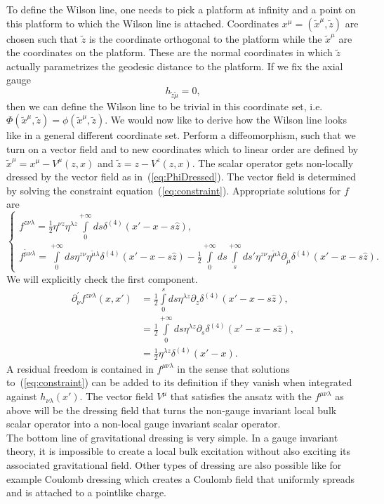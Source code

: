 \documentclass{PoS}
\begin{document}
To define the Wilson line, one needs to pick a platform at infinity and a point on this platform to which the Wilson line is attached. Coordinates $x^\mu = (\tilde{x}^\mu,\tilde{z})$ are chosen such that $\tilde{z}$ is the coordinate orthogonal to the platform while the $\tilde{x}^\mu$ are the coordinates on the platform. These are the normal coordinates in which $\tilde{z}$ actually parametrizes the geodesic distance to the platform. If we fix the axial gauge
\begin{equation}
h_{\tilde{z}\tilde{\mu}}=0,
\end{equation}
then we can define the Wilson line to be trivial in this coordinate set, i.e. $\Phi(\tilde{x}^\mu,\tilde{z}) = \phi(\tilde{x}^\mu,\tilde{z})$. We would now like to derive how the Wilson line looks like in a general different coordinate set. Perform a diffeomorphism, such that we turn on a vector field and to new coordinates which to linear order are defined by $\tilde{x}^\mu = x^\mu - V^\mu(z,x)$ and $\tilde{z} = z - V^z (z,x)$. The scalar operator gets non-locally dressed by the vector field as in~(\ref{eq:PhiDressed}). The vector field is determined by solving the constraint equation~(\ref{eq:constraint}). Appropriate solutions for $f$ are~\cite{Donnelly:2015hta}
\begin{equation}
\left\{
\begin{matrix}
f^{z\nu\lambda} = \frac{1}{2} \eta^{\nu z}\eta^{\lambda z} \int\limits_0^{+\infty} ds \delta^{(4)}(x'-x-s\hat{z}),\\
f^{\tilde{\mu}\nu\lambda} = \int\limits_0^{+\infty} ds \eta^{z\nu} \eta^{\tilde{\mu}\lambda} \delta^{(4)}(x'-x-s\hat{z}) - \frac{1}{2}\int\limits_0^{+\infty} ds \int\limits_s^{+\infty} ds' \eta^{z\nu}\eta^{\tilde{\mu}\lambda} \partial_{\tilde{\mu}} \delta^{(4)}(x'-x-s\hat{z}).
\end{matrix}
\right.
\end{equation}
We will explicitly check the first component.
\begin{align}
\partial^{'}_\nu f^{z\nu\lambda}(x,x') &= \frac{1}{2}\int\limits_{0}^s ds \eta^{\lambda z} \partial_z \delta^{(4)}(x'-x-s\hat{z}),\nonumber\\
&= \frac{1}{2} \int\limits_{0}^{+\infty} ds \eta^{\lambda z} \partial_s \delta^{(4)}(x'-x-s\hat{z}),\nonumber\\
&= \frac{1}{2}\eta^{\lambda z}\delta^{(4)}(x'-x).
\end{align}
A residual freedom is contained in $f^{\mu\nu\lambda}$ in the sense that solutions to~(\ref{eq:constraint}) can be added to its definition if they vanish when integrated against $h_{\nu\lambda}(x')$. The vector field $V^\mu$ that satisfies the ansatz with the $f^{\mu\nu\lambda}$ as above will be the dressing field that turns the non-gauge invariant local bulk scalar operator into a non-local gauge invariant scalar operator.\\ The bottom line of gravitational dressing is very simple. In a gauge invariant theory, it is impossible to create a local bulk excitation without also exciting its associated gravitational field. Other types of dressing are also possible like for example Coulomb dressing which creates a Coulomb field that uniformly spreads and is attached to a pointlike charge.
\end{document}
